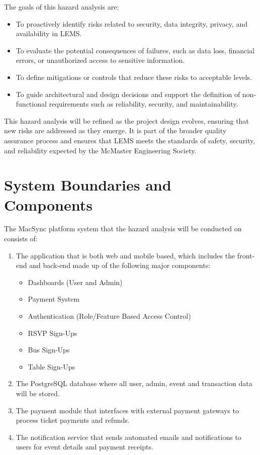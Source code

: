 \documentclass{article}
\begin{document}
The goals of this hazard analysis are:
\begin{itemize}
  \item To proactively identify risks related to security, data integrity, privacy, and availability in LEMS.
  \item To evaluate the potential consequences of failures, such as data loss, financial errors, or 
        unauthorized access to sensitive information.
  \item To define mitigations or controls that reduce these risks to acceptable levels.
  \item To guide architectural and design decisions and support the definition of non-functional 
        requirements such as reliability, security, and maintainability.
\end{itemize}

This hazard analysis will be refined as the project design evolves, ensuring that new risks are 
addressed as they emerge. It is part of the broader quality assurance process and ensures that LEMS 
meets the standards of safety, security, and reliability expected by the McMaster Engineering Society.

\section{System Boundaries and Components}

The MacSync platform system that the hazard analysis will be conducted on consists of:
\begin{enumerate}
    \item The application that is both web and mobile based, which includes the front-end and back-end made up of the following major components:
    \begin{itemize}
        \item Dashboards (User and Admin)
        \item Payment System
        \item Authentication (Role/Feature Based Access Control)
        \item RSVP Sign-Ups
        \item Bus Sign-Ups
        \item Table Sign-Ups
    \end{itemize}
    \item The PostgreSQL database where all user, admin, event and transaction data will be stored.
    \item The payment module that interfaces with external payment gateways to process ticket payments and refunds.
    \item The notification service that sends automated emails and notifications to users for event details and payment receipts.
\end{enumerate}
\end{document}
